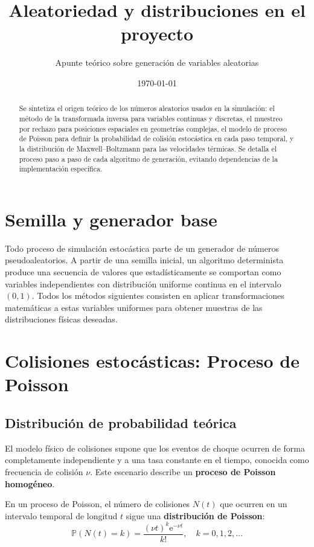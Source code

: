 \documentclass[11pt]{article}
\title{\textbf{Aleatoriedad y distribuciones en el proyecto}}
\author{Apunte teórico sobre generación de variables aleatorias}
\date{\today}
\begin{document}
\maketitle
\thispagestyle{fancy}

\begin{abstract}
\noindent
Se sintetiza el origen teórico de los números aleatorios usados en la simulación:
el método de la transformada inversa para variables continuas y discretas,
el muestreo por rechazo para posiciones espaciales en geometrías complejas, el modelo de proceso de
Poisson para definir la probabilidad de colisión estocástica en cada paso temporal, y
la distribución de Maxwell--Boltzmann para las velocidades térmicas. Se detalla el proceso paso a paso de cada algoritmo de generación, evitando dependencias de la implementación específica.
\end{abstract}

\section{Semilla y generador base}

Todo proceso de simulación estocástica parte de un generador de números pseudoaleatorios. A partir de una semilla inicial, un algoritmo determinista produce una secuencia de valores que estadísticamente se comportan como variables independientes con distribución uniforme continua en el intervalo $(0,1)$. Todos los métodos siguientes consisten en aplicar transformaciones matemáticas a estas variables uniformes para obtener muestras de las distribuciones físicas deseadas.

\section{Colisiones estocásticas: Proceso de Poisson}

\subsection{Distribución de probabilidad teórica}

El modelo físico de colisiones supone que los eventos de choque ocurren de forma completamente independiente y a una tasa constante en el tiempo, conocida como frecuencia de colisión $\nu$. Este escenario describe un \textbf{proceso de Poisson homogéneo}.

En un proceso de Poisson, el número de colisiones $N(t)$ que ocurren en un intervalo temporal de longitud $t$ sigue una \textbf{distribución de Poisson}:
\begin{equation}
  \mathbb P(N(t) = k) = \frac{(\nu t)^k \mathrm{e}^{-\nu t}}{k!}, \quad k = 0, 1, 2, \dots
\end{equation}
\end{document}

